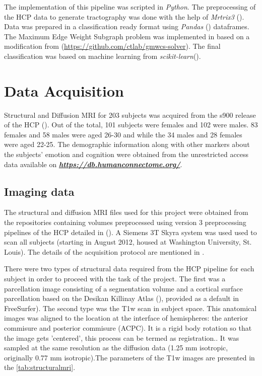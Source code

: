 \documentclass[msthesis.tex]{subfiles}
\begin{document}
The implementation of this pipeline was scripted in \textit{Python}. The preprocessing of the HCP data to generate tractography was done with the help of \textit{Mrtrix3} (\cite{tournier2019mrtrix3}).  Data was prepared in a classification ready format using \textit{Pandas} (\cite{pandas_2020}) dataframes. The Maximum Edge Weight Subgraph problem was implemented in  based on a modification from \cite{DBLP:journals/corr/LobodaAS16} (\hyperlink{\textbf{github.com/ctlab/gmwcs-solver}}{https://github.com/ctlab/gmwcs-solver}). The final classification was based on machine learning from \textit{scikit-learn}(\cite{sklearn_2012}). 

\section{Data Acquisition}
\label{sec:acquisition}
Structural and Diffusion MRI for 203 subjects was acquired from the s900 release of the HCP (\cite{hcp2015wu}). Out of the total, 101 subjects were females and 102 were males. 83 females and 58 males were aged 26-30 and while the 34 males and 28 females were aged 22-25. The demographic information along with other markers about the subjects' emotion and cognition were obtained from the unrestricted access data available on \href{https://db.humanconnectome.org/}{\textbf{\textit{https://db.humanconnectome.org/}}}.

\subsection{Imaging data}
The structural and diffusion MRI files used for this project were obtained from the repositories containing volumes preprocessed using version 3 preprocessing pipelines of the HCP detailed in (\cite{GLASSER2013105}). A Siemens 3T Skyra system was used used to scan all subjects (starting in August 2012, housed at Washington University, St. Louis). The details of the acquisition protocol are mentioned in \cite{van2012human}.


There were two types of structural data required from the HCP pipeline for each subject in order to proceed with the task of the project. The first was a parcellation image consisting of a segmentation volume and a cortical surface parcellation based on the Desikan Killinay Atlas (\cite{desikan2006automated}), provided as a default in FreeSurfer). The second type was the T1w scan in subject space. This anatomical images was aligned to the location at the interface of hemispheres: the anterior commisure and posterior commisure (ACPC). It is a rigid body rotation so that the image gets 'centered', this process can be termed as registration.. It was sampled at the same resolution as the diffusion data (1.25 mm isotropic, originally 0.77 mm isotropic).The parameters of the T1w images are presented in the \autoref{tab:structuralmri}.
\end{document}

